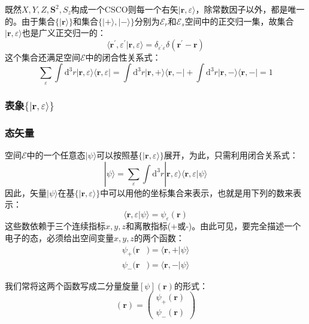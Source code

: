 \documentclass[]{article}
\begin{document}
既然$X,Y,Z,\boldsymbol{S}^2,S_z$构成一个CSCO则每一个右矢$|\boldsymbol{r},\varepsilon\rangle$，除常数因子以外，都是唯一的。由于集合$\{|\boldsymbol{r}\rangle\}$和集合$\{|+\rangle,|-\rangle\}$分别为$\mathscr{E}_r$和$\mathscr{E}_s$空间中的正交归一集，故集合$|\boldsymbol{r},\varepsilon\rangle$也是广义正交归一的：
\begin{equation}
	\langle \boldsymbol{r}^\prime,\varepsilon^\prime|\boldsymbol{r},\varepsilon\rangle=\delta_{\varepsilon^\prime\varepsilon}\delta(\boldsymbol{r}^\prime-\boldsymbol{r})
\end{equation}
这个集合还满足空间$\mathscr{E}$中的闭合性关系式：
\begin{equation}
	\sum\limits_{\varepsilon}\int\mathrm{d}^3r|\boldsymbol{r},\varepsilon\rangle\langle \boldsymbol{r},\varepsilon|=\int\mathrm{d}^3r|\boldsymbol{r},+\rangle\langle \boldsymbol{r},-|+\int\mathrm{d}^3r|\boldsymbol{r},-\rangle\langle \boldsymbol{r},-|=1
	\label{c5c5}
\end{equation}
\subsubsection{表象$\{|\boldsymbol{r},\varepsilon\rangle\}$}
\subsubsection{态矢量}
空间$\mathscr{E}$中的一个任意态$|\psi\rangle$可以按照基$\{|\boldsymbol{r},\varepsilon\rangle\}$展开，为此，只需利用闭合关系式：
\begin{equation}
	|\psi\rangle=\sum\limits_{\varepsilon}\int\mathrm{d}^3r|\boldsymbol{r},\varepsilon\rangle\langle \boldsymbol{r},\varepsilon|\psi\rangle
	\label{c6c6}
\end{equation}
因此，矢量$|\psi\rangle$在基$\{|\boldsymbol{r},\varepsilon\rangle\}$中可以用他的坐标集合来表示，也就是用下列的数来表示：
\begin{equation}
	\langle \boldsymbol{r},\varepsilon|\psi\rangle=\psi_{\varepsilon}(\boldsymbol{r})
	\label{c7c7}
\end{equation}
这些数依赖于三个连续指标$x,y,z$和离散指标(+或-)。由此可见，要完全描述一个电子的态，必须给出空间变量$x,y,z$的两个函数：
\begin{align}
	\psi_+(\boldsymbol{r}&)=\langle \boldsymbol{r},+|\psi\rangle\nonumber\\
	\psi_-(\boldsymbol{r}&)=\langle \boldsymbol{r},-|\psi\rangle
\end{align}

我们常将这两个函数写成二分量旋量$[\psi](\boldsymbol{r})$的形式：
\begin{equation}
	[\psi](\boldsymbol{r})=\begin{pmatrix}
		\psi_+(\boldsymbol{r})\\
		\psi_-(\boldsymbol{r})
	\end{pmatrix}
	\label{c9c9}
\end{equation}
\end{document}

